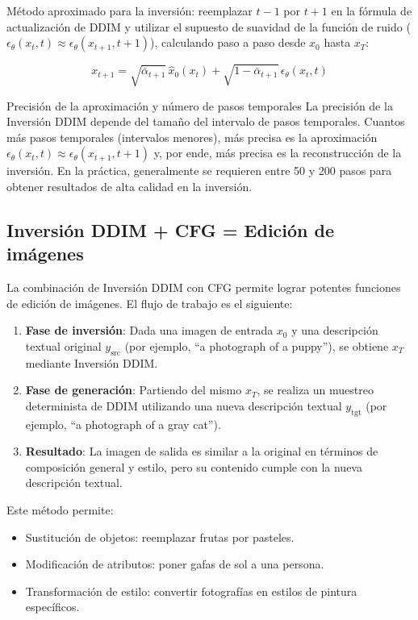 \documentclass[a4paper]{article}
\begin{document}
Método aproximado para la inversión: reemplazar $t-1$ por $t+1$ en la fórmula de actualización de DDIM y utilizar el supuesto de suavidad de la función de ruido ($\epsilon_\theta(x_t, t) \approx \epsilon_\theta(x_{t+1}, t+1)$), calculando paso a paso desde $x_0$ hasta $x_T$:

$$
x_{t+1} = \sqrt{\bar\alpha_{t+1}}\,\hat{x}_0(x_t) + \sqrt{1-\bar\alpha_{t+1}}\,\epsilon_\theta(x_t, t)
$$

\begin{knowledgebox}{Precisión de la aproximación y número de pasos temporales}
La precisión de la Inversión DDIM depende del tamaño del intervalo de pasos temporales. Cuantos más pasos temporales (intervalos menores), más precisa es la aproximación $\epsilon_\theta(x_t, t) \approx \epsilon_\theta(x_{t+1}, t+1)$ y, por ende, más precisa es la reconstrucción de la inversión. En la práctica, generalmente se requieren entre 50 y 200 pasos para obtener resultados de alta calidad en la inversión.
\end{knowledgebox}

\subsection{Inversión DDIM + CFG = Edición de imágenes}

La combinación de Inversión DDIM con CFG permite lograr potentes funciones de edición de imágenes. El flujo de trabajo es el siguiente:

\begin{enumerate}
    \item \textbf{Fase de inversión}: Dada una imagen de entrada $x_0$ y una descripción textual original $y_{\text{src}}$ (por ejemplo, ``a photograph of a puppy''), se obtiene $x_T$ mediante Inversión DDIM.
    \item \textbf{Fase de generación}: Partiendo del mismo $x_T$, se realiza un muestreo determinista de DDIM utilizando una nueva descripción textual $y_{\text{tgt}}$ (por ejemplo, ``a photograph of a gray cat'').
    \item \textbf{Resultado}: La imagen de salida es similar a la original en términos de composición general y estilo, pero su contenido cumple con la nueva descripción textual.
\end{enumerate}

Este método permite:
\begin{itemize}
    \item Sustitución de objetos: reemplazar frutas por pasteles.
    \item Modificación de atributos: poner gafas de sol a una persona.
    \item Transformación de estilo: convertir fotografías en estilos de pintura específicos.
\end{itemize}
\end{document}
